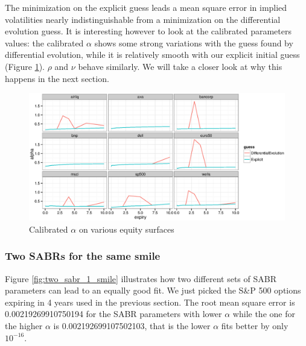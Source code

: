 \documentclass[]{rAMF2e}
\begin{document}
The minimization on the explicit guess leads a mean square error in implied volatilities nearly indistinguishable from a minimization on the differential evolution guess. It is interesting however to look at the calibrated parameters values: the calibrated $\alpha$ shows some strong variations with the guess found by differential evolution, while it is relatively smooth with our explicit initial guess (Figure  \ref{fig:explicit_de_equity_alpha}). $\rho$ and $\nu$ behave similarly. We will take a closer look at why this happens in the next section.
\begin{figure}[!h]
  \caption{\label{fig:explicit_de_equity_alpha}Calibrated $\alpha$ on various equity surfaces}
\begin{center}
 \includegraphics[width=16cm]{explicit_de_equity_alpha.eps}
\end{center}
\end{figure}


\subsubsection{Two SABRs for the same smile}
Figure \ref{fig:two_sabr_1_smile} illustrates how two different sets of SABR parameters can lead to an equally good fit. We just picked the S\&P 500 options expiring in 4 years used in the previous section. The root mean square error is  0.00219269910750194 for the SABR parameters with lower $\alpha$ while the one for the higher $\alpha$ is 0.002192699107502103, that is the lower $\alpha$ fits better by only $10^{-16}$.
\end{document}
